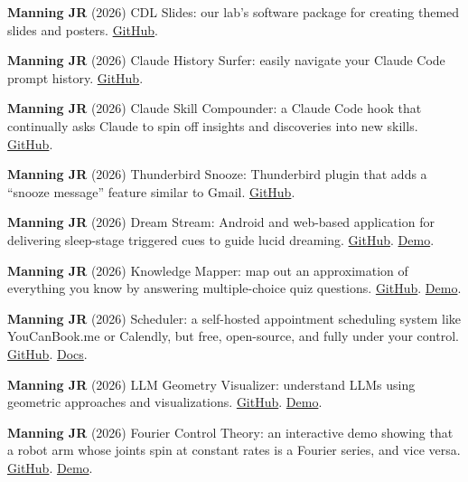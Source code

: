 \documentclass[11pt, a4paper]{article} %
\begin{document}
\begin{etaremune}
\item \textbf{Manning JR} (2026) CDL Slides: our lab's software package for creating themed slides and posters. \href{https://github.com/ContextLab/cdl-slides}{GitHub}.
\item \textbf{Manning JR} (2026) Claude History Surfer: easily navigate your Claude Code prompt history. \href{https://github.com/ContextLab/claude-history-surfer}{GitHub}.
\item \textbf{Manning JR} (2026) Claude Skill Compounder: a Claude Code hook that continually asks Claude to spin off insights and discoveries into new skills. \href{https://github.com/ContextLab/claude-skill-compounder}{GitHub}.
\item \textbf{Manning JR} (2026) Thunderbird Snooze: Thunderbird plugin that adds a ``snooze message'' feature similar to Gmail. \href{https://github.com/ContextLab/thunderbird-snooze}{GitHub}.
\item \textbf{Manning JR} (2026) Dream Stream: Android and web-based application for delivering sleep-stage triggered cues to guide lucid dreaming. \href{https://github.com/ContextLab/dream-stream}{GitHub}. \href{https://context-lab.com/dream-stream/}{Demo}.
\item \textbf{Manning JR} (2026) Knowledge Mapper: map out an approximation of everything you know by answering multiple-choice quiz questions. \href{https://github.com/ContextLab/mapper}{GitHub}. \href{https://context-lab.com/mapper/}{Demo}.
\item \textbf{Manning JR} (2026) Scheduler: a self-hosted appointment scheduling system like YouCanBook.me or Calendly, but free, open-source, and fully under your control. \href{https://github.com/ContextLab/scheduler}{GitHub}. \href{https://cdl-scheduler.readthedocs.io/}{Docs}.
\item \textbf{Manning JR} (2026) LLM Geometry Visualizer: understand LLMs using geometric approaches and visualizations. \href{https://github.com/ContextLab/llm-geometry}{GitHub}. \href{https://context-lab.com/llm-geometry}{Demo}.
\item \textbf{Manning JR} (2026) Fourier Control Theory: an interactive demo showing that a robot arm whose joints spin at constant rates is a Fourier series, and vice versa. \href{https://github.com/ContextLab/fourier-control-theory}{GitHub}. \href{https://context-lab.com/fourier-control-theory}{Demo}.

\end{etaremune}
\end{document}
